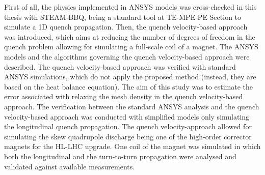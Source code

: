 
First of all, the physics implemented in ANSYS models was cross-checked in this thesis with STEAM-BBQ, being a standard tool at TE-MPE-PE Section to simulate a 1D quench propagation. Then, the quench velocity-based approach was introduced, which aims at reducing the number of degrees of freedom in the quench problem allowing for simulating a full-scale coil of a magnet. The ANSYS models and the algorithms governing the quench velocity-based approach were described. The quench velocity-based approach was verified with standard ANSYS simulations, which do not apply the proposed method (instead, they are based on the heat balance equation). The aim of this study was to estimate the error associated with relaxing the mesh density in the quench velocity-based approach. The verification between the standard ANSYS analysis and the quench velocity-based approach was conducted with simplified models only simulating the longitudinal quench propagation. The quench velocity-approach allowed for simulating the skew quadrupole discharge being one of the high-order corrector magnets for the HL-LHC upgrade. One coil of the magnet was simulated in which both the longitudinal and the turn-to-turn propagation were analysed and validated against available measurements.

